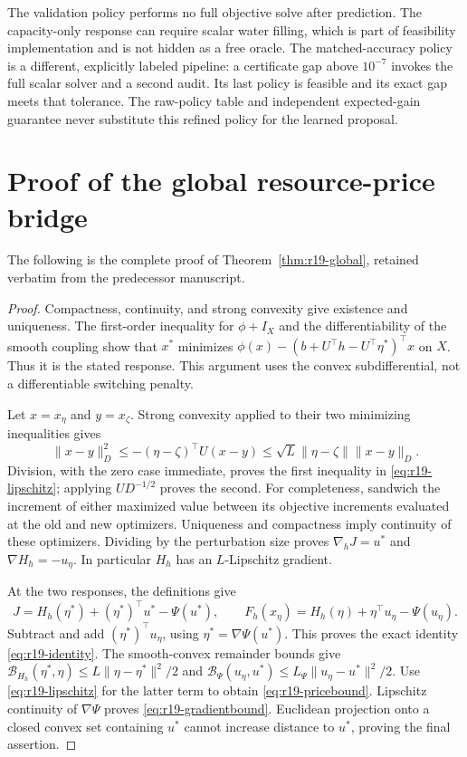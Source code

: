 \documentclass[11pt,letterpaper]{article}
\theoremstyle{definition}
\newcommand{\1}{\mathbf 1}
\begin{document}
The validation policy performs no full objective solve after prediction. The capacity-only response can require scalar water filling, which is part of feasibility implementation and is not hidden as a free oracle. The matched-accuracy policy is a different, explicitly labeled pipeline: a certificate gap above $10^{-7}$ invokes the full scalar solver and a second audit. Its last policy is feasible and its exact gap meets that tolerance. The raw-policy table and independent expected-gain guarantee never substitute this refined policy for the learned proposal.


\clearpage
\section{Proof of the global resource-price bridge}\label{ec:r23-preserved-global-proof}
The following is the complete proof of Theorem~\ref{thm:r19-global}, retained verbatim from the predecessor manuscript.
\begin{proof}
Compactness, continuity, and strong convexity give existence and uniqueness. The first-order inequality for $\phi+I_X$ and the differentiability of the smooth coupling show that $x^*$ minimizes $\phi(x)-(b+U^\top h- U^\top\eta^*)^\top x$ on $X$. Thus it is the stated response. This argument uses the convex subdifferential, not a differentiable switching penalty.

Let $x=x_\eta$ and $y=x_\zeta$. Strong convexity applied to their two minimizing inequalities gives
\[
 \|x-y\|_D^2\leq-(\eta-\zeta)^\top U(x-y)
 \leq\sqrt L\|\eta-\zeta\|\|x-y\|_D.
\]
Division, with the zero case immediate, proves the first inequality in \eqref{eq:r19-lipschitz}; applying $UD^{-1/2}$ proves the second. For completeness, sandwich the increment of either maximized value between its objective increments evaluated at the old and new optimizers. Uniqueness and compactness imply continuity of these optimizers. Dividing by the perturbation size proves $\nabla_hJ=u^*$ and $\nabla H_h=-u_\eta$. In particular $H_h$ has an $L$-Lipschitz gradient.

At the two responses, the definitions give
\[
 J=H_h(\eta^*)+(\eta^*)^\top u^*-\Psi(u^*),\qquad
 F_h(x_\eta)=H_h(\eta)+\eta^\top u_\eta-\Psi(u_\eta).
\]
Subtract and add $(\eta^*)^\top u_\eta$, using $\eta^*=\nabla\Psi(u^*)$. This proves the exact identity \eqref{eq:r19-identity}. The smooth-convex remainder bounds give
$\mathcal B_{H_h}(\eta^*,\eta)\leq L\|\eta-\eta^*\|^2/2$ and
$\mathcal B_\Psi(u_\eta,u^*)\leq L_\Psi\|u_\eta-u^*\|^2/2$.
Use \eqref{eq:r19-lipschitz} for the latter term to obtain \eqref{eq:r19-pricebound}. Lipschitz continuity of $\nabla\Psi$ proves \eqref{eq:r19-gradientbound}. Euclidean projection onto a closed convex set containing $u^*$ cannot increase distance to $u^*$, proving the final assertion.
\end{proof}
\end{document}
